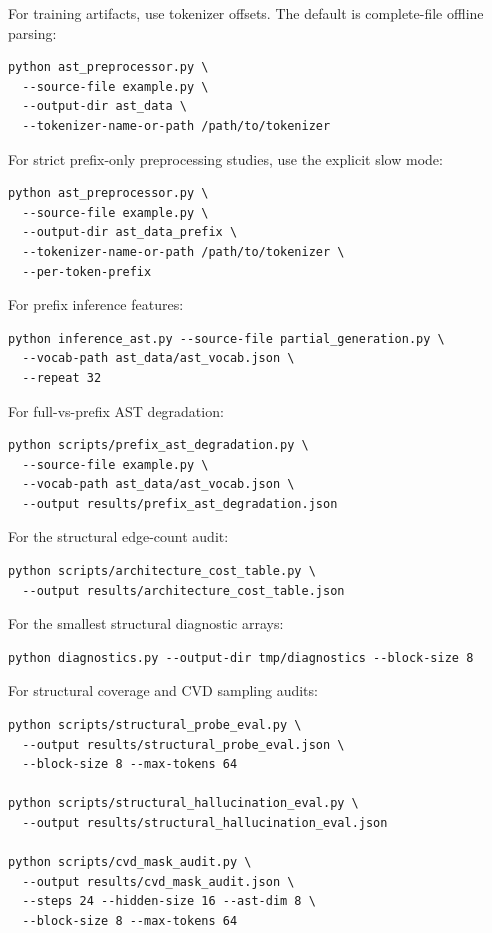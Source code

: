 \documentclass[10pt]{article}
\begin{document}
For training artifacts, use tokenizer offsets.  The default is complete-file
offline parsing:
\begin{verbatim}
python ast_preprocessor.py \
  --source-file example.py \
  --output-dir ast_data \
  --tokenizer-name-or-path /path/to/tokenizer
\end{verbatim}

For strict prefix-only preprocessing studies, use the explicit slow mode:
\begin{verbatim}
python ast_preprocessor.py \
  --source-file example.py \
  --output-dir ast_data_prefix \
  --tokenizer-name-or-path /path/to/tokenizer \
  --per-token-prefix
\end{verbatim}

For prefix inference features:
\begin{verbatim}
python inference_ast.py --source-file partial_generation.py \
  --vocab-path ast_data/ast_vocab.json \
  --repeat 32
\end{verbatim}

For full-vs-prefix AST degradation:
\begin{verbatim}
python scripts/prefix_ast_degradation.py \
  --source-file example.py \
  --vocab-path ast_data/ast_vocab.json \
  --output results/prefix_ast_degradation.json
\end{verbatim}

For the structural edge-count audit:
\begin{verbatim}
python scripts/architecture_cost_table.py \
  --output results/architecture_cost_table.json
\end{verbatim}

For the smallest structural diagnostic arrays:
\begin{verbatim}
python diagnostics.py --output-dir tmp/diagnostics --block-size 8
\end{verbatim}

For structural coverage and CVD sampling audits:
\begin{verbatim}
python scripts/structural_probe_eval.py \
  --output results/structural_probe_eval.json \
  --block-size 8 --max-tokens 64

python scripts/structural_hallucination_eval.py \
  --output results/structural_hallucination_eval.json

python scripts/cvd_mask_audit.py \
  --output results/cvd_mask_audit.json \
  --steps 24 --hidden-size 16 --ast-dim 8 \
  --block-size 8 --max-tokens 64
\end{verbatim}
\end{document}
